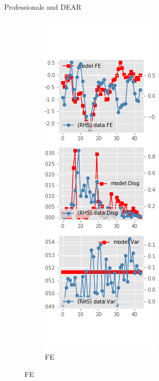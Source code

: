 \documentclass{beamer}
\begin{document}
\begin{frame}{Professionals and DEAR}
	\begin{figure}[ht]
		\label{DE_diag_SPF}
		\begin{subfigure}[b]{0.2\textwidth}
			\centering
			\caption{FE}
			\includegraphics[width=\textwidth, height = 0.8\textheight]{figuresDraft/spf_de_est_diag0.png}

\end{subfigure}
\end{figure}
\end{frame}
\end{document}
